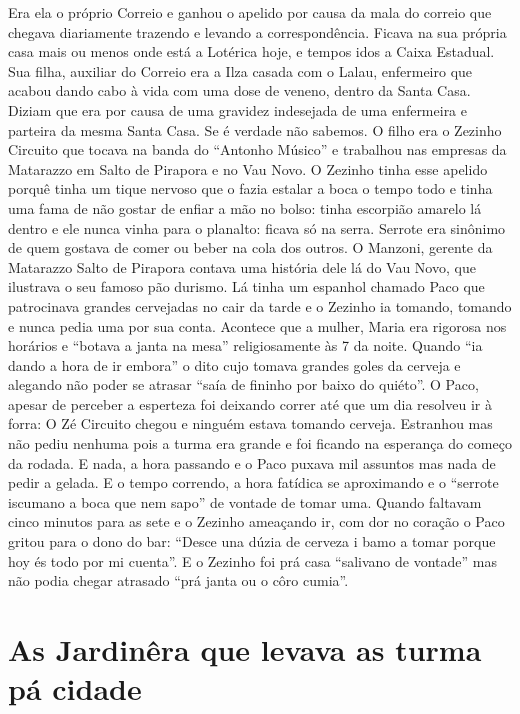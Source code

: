 \documentclass[12pt,brazil,]{book}
\begin{document}
Era ela o próprio Correio e ganhou o apelido por causa da mala do
correio que chegava diariamente trazendo e levando a correspondência.
Ficava na sua própria casa mais ou menos onde está a Lotérica hoje, e
tempos idos a Caixa Estadual. Sua filha, auxiliar do Correio era a Ilza
casada com o Lalau, enfermeiro que acabou dando cabo à vida com uma dose
de veneno, dentro da Santa Casa. Diziam que era por causa de uma
gravidez indesejada de uma enfermeira e parteira da mesma Santa Casa. Se
é verdade não sabemos. O filho era o Zezinho Circuito que tocava na
banda do ``Antonho Músico'' e trabalhou nas empresas da Matarazzo em
Salto de Pirapora e no Vau Novo. O Zezinho tinha esse apelido porquê
tinha um tique nervoso que o fazia estalar a boca o tempo todo e tinha
uma fama de não gostar de enfiar a mão no bolso: tinha escorpião amarelo
lá dentro e ele nunca vinha para o planalto: ficava só na serra. Serrote
era sinônimo de quem gostava de comer ou beber na cola dos outros. O
Manzoni, gerente da Matarazzo Salto de Pirapora contava uma história
dele lá do Vau Novo, que ilustrava o seu famoso pão durismo. Lá tinha um
espanhol chamado Paco que patrocinava grandes cervejadas no cair da
tarde e o Zezinho ia tomando, tomando e nunca pedia uma por sua conta.
Acontece que a mulher, Maria era rigorosa nos horários e ``botava a
janta na mesa'' religiosamente às 7 da noite. Quando ``ia dando a hora
de ir embora'' o dito cujo tomava grandes goles da cerveja e alegando
não poder se atrasar ``saía de fininho por baixo do quiéto''. O Paco,
apesar de perceber a esperteza foi deixando correr até que um dia
resolveu ir à forra: O Zé Circuito chegou e ninguém estava tomando
cerveja. Estranhou mas não pediu nenhuma pois a turma era grande e foi
ficando na esperança do começo da rodada. E nada, a hora passando e o
Paco puxava mil assuntos mas nada de pedir a gelada. E o tempo correndo,
a hora fatídica se aproximando e o ``serrote iscumano a boca que nem
sapo'' de vontade de tomar uma. Quando faltavam cinco minutos para as
sete e o Zezinho ameaçando ir, com dor no coração o Paco gritou para o
dono do bar: ``Desce una dúzia de cerveza i bamo a tomar porque hoy és
todo por mi cuenta''. E o Zezinho foi prá casa ``salivano de vontade''
mas não podia chegar atrasado ``prá janta ou o côro cumia''.

\section{As Jardinêra que levava as turma pá
cidade}\label{as-jardinuxeara-que-levava-as-turma-puxe1-cidade}
\end{document}
